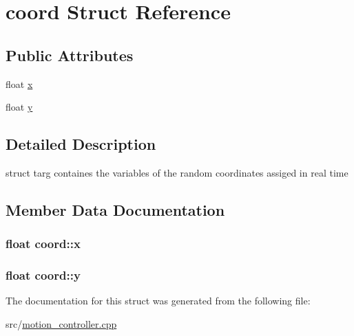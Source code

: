 \hypertarget{structcoord}{}\section{coord Struct Reference}
\label{structcoord}
\subsection*{Public Attributes}
\begin{DoxyCompactItemize}
\item 
float \hyperlink{structcoord_a6b6f43b5ea14a9822f537dc535293036}{x}
\item 
float \hyperlink{structcoord_ad2aee0228903d1f8874a7a43e9227749}{y}
\end{DoxyCompactItemize}


\subsection{Detailed Description}
struct targ containes the variables of the random coordinates assiged in real time 

\subsection{Member Data Documentation}
\subsubsection[{\texorpdfstring{x}{x}}]{\setlength{\rightskip}{0pt plus 5cm}float coord\+::x}\hypertarget{structcoord_a6b6f43b5ea14a9822f537dc535293036}{}\label{structcoord_a6b6f43b5ea14a9822f537dc535293036}
\subsubsection[{\texorpdfstring{y}{y}}]{\setlength{\rightskip}{0pt plus 5cm}float coord\+::y}\hypertarget{structcoord_ad2aee0228903d1f8874a7a43e9227749}{}\label{structcoord_ad2aee0228903d1f8874a7a43e9227749}


The documentation for this struct was generated from the following file\+:\begin{DoxyCompactItemize}
\item 
src/\hyperlink{motion__controller_8cpp}{motion\+\_\+controller.\+cpp}\end{DoxyCompactItemize}
